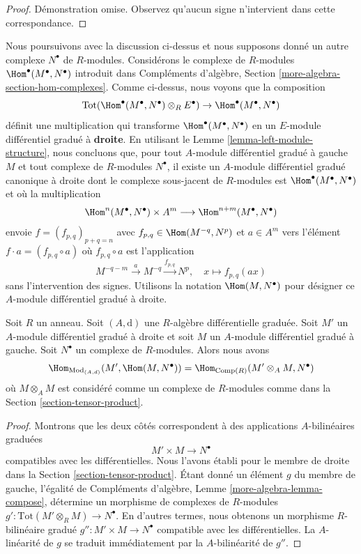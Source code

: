\begin{proof}
Démonstration omise. Observez qu'aucun signe n'intervient dans cette
correspondance.
\end{proof}

\noindent
Nous poursuivons avec la discussion ci-dessus et nous supposons donné un autre
complexe $N^\bullet$ de $R$-modules. Considérons le complexe de $R$-modules
$\Hom^\bullet(M^\bullet, N^\bullet)$ introduit dans Compléments d'algèbre, Section
\ref{more-algebra-section-hom-complexes}. Comme ci-dessus, nous voyons que la
composition
$$
\text{Tot}(\Hom^\bullet(M^\bullet, N^\bullet) \otimes_R E^\bullet)
\to \Hom^\bullet(M^\bullet, N^\bullet)
$$
définit une multiplication qui transforme $\Hom^\bullet(M^\bullet, N^\bullet)$ en
un $E$-module différentiel gradué à {\bf droite}. En utilisant le Lemme
\ref{lemma-left-module-structure}, nous concluons que, pour tout $A$-module
différentiel gradué à gauche $M$ et tout complexe de $R$-modules $N^\bullet$, il
existe un $A$-module différentiel gradué canonique à droite dont le complexe
sous-jacent de $R$-modules est $\Hom^\bullet(M^\bullet, N^\bullet)$ et où la
multiplication
$$
\Hom^n(M^\bullet, N^\bullet) \times A^m \longrightarrow
\Hom^{n + m}(M^\bullet, N^\bullet)
$$
envoie $f = (f_{p, q})_{p + q = n}$ avec $f_{p, q} \in \Hom(M^{-q}, N^p)$ et $a
\in A^m$ vers l'élément $f \cdot a = (f_{p, q} \circ a)$ où $f_{p, q} \circ a$ est
l'application
$$
M^{-q - m} \xrightarrow{a} M^{-q} \xrightarrow{f_{p, q}} N^p, \quad
x \longmapsto f_{p, q}(ax)
$$
sans l'intervention des signes. Utilisons la notation $\Hom(M, N^\bullet)$ pour
désigner ce $A$-module différentiel gradué à droite.

\begin{lemma}
\label{lemma-characterize-hom}
Soit $R$ un anneau. Soit $(A, \text{d})$ une $R$-algèbre différentielle graduée.
Soit $M'$ un $A$-module différentiel gradué à droite et soit $M$ un $A$-module
différentiel gradué à gauche. Soit $N^\bullet$ un complexe de $R$-modules. Alors
nous avons
$$
\Hom_{\text{Mod}_{(A, d)}}(M', \Hom(M, N^\bullet)) =
\Hom_{\text{Comp}(R)}(M' \otimes_A M, N^\bullet)
$$
où $M \otimes_A M$ est considéré comme un complexe de $R$-modules comme dans la
Section \ref{section-tensor-product}.
\end{lemma}

\begin{proof}
Montrons que les deux côtés correspondent à des applications $A$-bilinéaires
graduées
$$
M' \times M \longrightarrow N^\bullet
$$
compatibles avec les différentielles. Nous l'avons établi pour le membre de
droite dans la Section \ref{section-tensor-product}. Étant donné un élément $g$ du
membre de gauche, l'égalité de Compléments d'algèbre, Lemme \ref{more-algebra-lemma-compose},
détermine un morphisme de complexes de $R$-modules $g' : \text{Tot}(M'
\otimes_R M) \to N^\bullet$. En d'autres termes, nous obtenons un morphisme
$R$-bilinéaire gradué $g'' : M' \times M \to N^\bullet$ compatible avec les
différentielles. La $A$-linéarité de $g$ se traduit immédiatement par la
$A$-bilinéarité de $g''$.
\end{proof}

